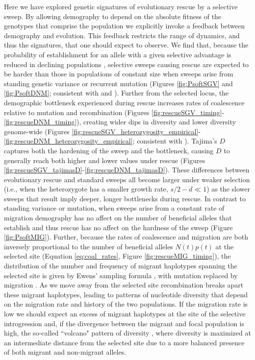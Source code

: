 \documentclass[]{article}
\begin{document}
Here we have explored genetic signatures of evolutionary rescue by a selective sweep. 
By allowing demography to depend on the absolute fitness of the genotypes that comprise the population we explicitly invoke a feedback between demography and evolution.
This feedback restricts the range of dynamics, and thus the signatures, that one should expect to observe.
We find that, because the probability of establishment for an allele with a given selective advantage is reduced in declining populations \citep[Equation \ref{eq:pest}; see also][]{otto1997probability}, selective sweeps causing rescue are expected to be harder than those in populations of constant size when sweeps arise from standing genetic variance or recurrent mutation (Figures \ref{fig:PsoftSGV} and \ref{fig:PsoftDNM}; consistent with \citealp{wilson2014soft} and \citealp{wilson2017soft}).
Further from the selected locus, the demographic bottleneck experienced during rescue increases rates of coalescence relative to mutation and recombination (Figures \ref{fig:rescueSGV_timing}-\ref{fig:rescueDNM_timing}), creating wider dips in diversity and lower diversity genome-wide (Figures \ref{fig:rescueSGV_heterozygosity_empirical}-\ref{fig:rescueDNM_heterozygosity_empirical}; consistent with \citealp{innan2004pattern}). 
Tajima's $D$ captures both the hardening of the sweep and the bottleneck, causing $D$ to generally reach both higher and lower values under rescue (Figures \ref{fig:rescueSGV_tajimasD}-\ref{fig:rescueDNM_tajimasD}).
These differences between evolutionary rescue and standard sweeps all become larger under weaker selection (i.e., when the heterozygote has a smaller growth rate, $s/2-d\ll1$) as the slower sweeps that result imply deeper, longer bottlenecks during rescue.
In contrast to standing variance or mutation, when sweeps arise from a constant rate of migration demography has no affect on the number of beneficial alleles that establish \citep[as briefly noted by][]{pennings2006soft2} and thus rescue has no affect on the hardness of the sweep (Figure \ref{fig:PsoftMIG}). 
Further, because the rates of coalescence and migration are both inversely proportional to the number of beneficial alleles $N(t)p(t)$ at the selected site (Equation \ref{eq:coal_rates}, Figure \ref{fig:rescueMIG_timing}), the distribution of the number and frequency of migrant haplotypes spanning the selected site is given by Ewens' sampling formula \citep{ewens1972sampling}, with mutation replaced by migration \citep{pennings2006soft2}.
As we move away from the selected site recombination breaks apart these migrant haplotypes, leading to patterns of nucleotide diversity that depend on the migration rate and history of the two populations.
If the migration rate is low we should expect an excess of migrant haplotypes at the site of the selective introgression and, if the divergence between the migrant and focal population is high, the so-called ``volcano" pattern of diversity \citep{setter2019volcanofinder}, where diversity is maximized at an intermediate distance from the selected site due to a more balanced presence of both migrant and non-migrant alleles.
\end{document}
